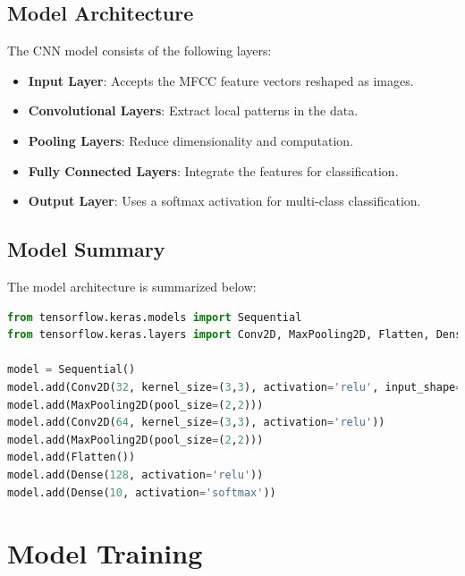 \documentclass[12pt]{article}
\begin{document}
\subsection{Model Architecture}

The CNN model consists of the following layers:

\begin{itemize}
    \item \textbf{Input Layer}: Accepts the MFCC feature vectors reshaped as images.
    \item \textbf{Convolutional Layers}: Extract local patterns in the data.
    \item \textbf{Pooling Layers}: Reduce dimensionality and computation.
    \item \textbf{Fully Connected Layers}: Integrate the features for classification.
    \item \textbf{Output Layer}: Uses a softmax activation for multi-class classification.
\end{itemize}

\subsection{Model Summary}

The model architecture is summarized below:

\begin{lstlisting}[language=Python, caption=Model Architecture]
from tensorflow.keras.models import Sequential
from tensorflow.keras.layers import Conv2D, MaxPooling2D, Flatten, Dense

model = Sequential()
model.add(Conv2D(32, kernel_size=(3,3), activation='relu', input_shape=(13, 13, 1)))
model.add(MaxPooling2D(pool_size=(2,2)))
model.add(Conv2D(64, kernel_size=(3,3), activation='relu'))
model.add(MaxPooling2D(pool_size=(2,2)))
model.add(Flatten())
model.add(Dense(128, activation='relu'))
model.add(Dense(10, activation='softmax'))
\end{lstlisting}

\newpage




\section{Model Training}
\end{document}
